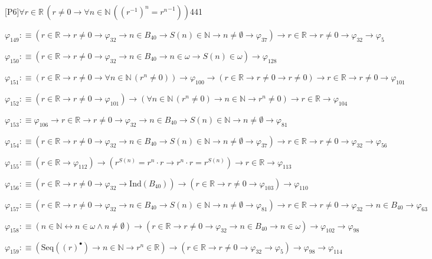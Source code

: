 \begin{fullproof}{[P6]}{$\forall r \in \mathbb{R}\,(r \neq 0 \to \forall n \in \mathbb{N}\,({{(r^{-1})}^{n}} = {{r}^{n}}^{-1}))$}{441}
\begin{abbrevlist}
\item $\varphi_{149} :\equiv (r \in \mathbb{R} \to r \neq 0 \to \varphi_{32} \to n \in B_{40} \to S(n) \in \mathbb{N} \to n \neq \emptyset \to \varphi_{37}) \to r \in \mathbb{R} \to r \neq 0 \to \varphi_{32} \to \varphi_{5}$
\item $\varphi_{150} :\equiv (r \in \mathbb{R} \to r \neq 0 \to \varphi_{32} \to n \in B_{40} \to n \in \omega \to S(n) \in \omega) \to \varphi_{128}$
\item $\varphi_{151} :\equiv (r \in \mathbb{R} \to r \neq 0 \to \forall n \in \mathbb{N}\,({{r}^{n}} \neq 0)) \to \varphi_{100} \to (r \in \mathbb{R} \to r \neq 0 \to r \neq 0) \to r \in \mathbb{R} \to r \neq 0 \to \varphi_{101}$
\item $\varphi_{152} :\equiv (r \in \mathbb{R} \to r \neq 0 \to \varphi_{101}) \to (\forall n \in \mathbb{N}\,({{r}^{n}} \neq 0) \to n \in \mathbb{N} \to {{r}^{n}} \neq 0) \to r \in \mathbb{R} \to \varphi_{104}$
\item $\varphi_{153} :\equiv \varphi_{106} \to r \in \mathbb{R} \to r \neq 0 \to \varphi_{32} \to n \in B_{40} \to S(n) \in \mathbb{N} \to n \neq \emptyset \to \varphi_{81}$
\item $\varphi_{154} :\equiv (r \in \mathbb{R} \to r \neq 0 \to \varphi_{32} \to n \in B_{40} \to S(n) \in \mathbb{N} \to n \neq \emptyset \to \varphi_{37}) \to r \in \mathbb{R} \to r \neq 0 \to \varphi_{32} \to \varphi_{56}$
\item $\varphi_{155} :\equiv (r \in \mathbb{R} \to \varphi_{112}) \to ({{r}^{S(n)}} = {{r}^{n}} \cdot r \to {{r}^{n}} \cdot r = {{r}^{S(n)}}) \to r \in \mathbb{R} \to \varphi_{113}$
\item $\varphi_{156} :\equiv (r \in \mathbb{R} \to r \neq 0 \to \varphi_{32} \to \mathrm{Ind}(B_{40})) \to (r \in \mathbb{R} \to r \neq 0 \to \varphi_{103}) \to \varphi_{110}$
\item $\varphi_{157} :\equiv (r \in \mathbb{R} \to r \neq 0 \to \varphi_{32} \to n \in B_{40} \to S(n) \in \mathbb{N} \to n \neq \emptyset \to \varphi_{81}) \to r \in \mathbb{R} \to r \neq 0 \to \varphi_{32} \to n \in B_{40} \to \varphi_{63}$
\item $\varphi_{158} :\equiv (n \in \mathbb{N} \leftrightarrow n \in \omega \land n \neq \emptyset) \to (r \in \mathbb{R} \to r \neq 0 \to \varphi_{32} \to n \in B_{40} \to n \in \omega) \to \varphi_{102} \to \varphi_{98}$
\item $\varphi_{159} :\equiv (\mathrm{Seq}({(r)^{\bullet}}) \to n \in \mathbb{N} \to {{r}^{n}} \in \mathbb{R}) \to (r \in \mathbb{R} \to r \neq 0 \to \varphi_{32} \to \varphi_{5}) \to \varphi_{98} \to \varphi_{114}$

\end{abbrevlist}
\end{fullproof}
